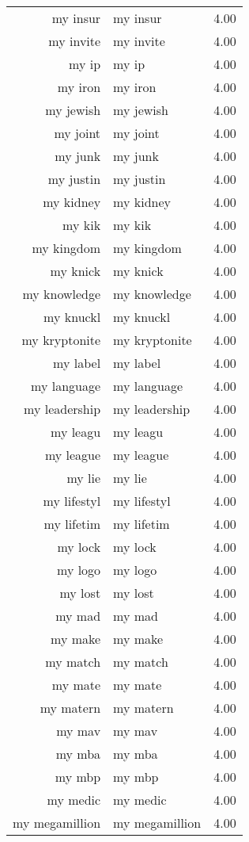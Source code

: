 \begin{table}[ht]
\begin{tabular}{rlr}
  my insur & my insur & 4.00 \\ 
  my invite & my invite & 4.00 \\ 
  my ip & my ip & 4.00 \\ 
  my iron & my iron & 4.00 \\ 
  my jewish & my jewish & 4.00 \\ 
  my joint & my joint & 4.00 \\ 
  my junk & my junk & 4.00 \\ 
  my justin & my justin & 4.00 \\ 
  my kidney & my kidney & 4.00 \\ 
  my kik & my kik & 4.00 \\ 
  my kingdom & my kingdom & 4.00 \\ 
  my knick & my knick & 4.00 \\ 
  my knowledge & my knowledge & 4.00 \\ 
  my knuckl & my knuckl & 4.00 \\ 
  my kryptonite & my kryptonite & 4.00 \\ 
  my label & my label & 4.00 \\ 
  my language & my language & 4.00 \\ 
  my leadership & my leadership & 4.00 \\ 
  my leagu & my leagu & 4.00 \\ 
  my league & my league & 4.00 \\ 
  my lie & my lie & 4.00 \\ 
  my lifestyl & my lifestyl & 4.00 \\ 
  my lifetim & my lifetim & 4.00 \\ 
  my lock & my lock & 4.00 \\ 
  my logo & my logo & 4.00 \\ 
  my lost & my lost & 4.00 \\ 
  my mad & my mad & 4.00 \\ 
  my make & my make & 4.00 \\ 
  my match & my match & 4.00 \\ 
  my mate & my mate & 4.00 \\ 
  my matern & my matern & 4.00 \\ 
  my mav & my mav & 4.00 \\ 
  my mba & my mba & 4.00 \\ 
  my mbp & my mbp & 4.00 \\ 
  my medic & my medic & 4.00 \\ 
  my megamillion & my megamillion & 4.00 \\ 

\end{tabular}
\end{table}
